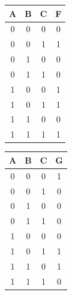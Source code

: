 \documentclass{article}
\begin{document}
    \begin{center}
        \begin{tabular} {ccc|c}
            A & B & C & F \\
            \hline
            0 & 0 & 0 & 0 \\
            0 & 0 & 1 & 1 \\
            0 & 1 & 0 & 0 \\
            0 & 1 & 1 & 0 \\
            1 & 0 & 0 & 1 \\
            1 & 0 & 1 & 1 \\
            1 & 1 & 0 & 0 \\
            1 & 1 & 1 & 1 \\
        \end{tabular}
        \quad\quad
        \begin{tabular} {ccc|c}
            A & B & C & G \\
            \hline
            0 & 0 & 0 & 1 \\
            0 & 0 & 1 & 0 \\
            0 & 1 & 0 & 0 \\
            0 & 1 & 1 & 0 \\
            1 & 0 & 0 & 0 \\
            1 & 0 & 1 & 1 \\
            1 & 1 & 0 & 1 \\
            1 & 1 & 1 & 0 \\
        \end{tabular}
    \end{center}
\end{document}

